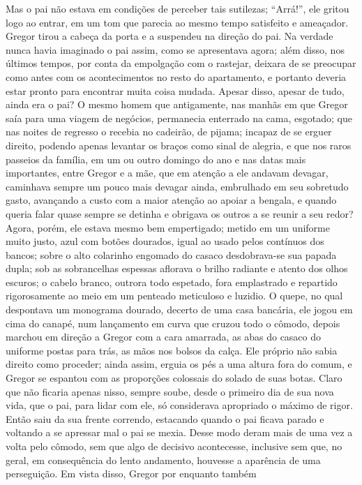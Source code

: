 Mas o pai não estava em condições de perceber tais sutilezas; “Arrá!”, ele
gritou logo ao entrar, em um tom que parecia ao mesmo tempo satisfeito e
ameaçador. Gregor tirou a cabeça da porta e a suspendeu na direção do pai.
Na verdade nunca havia imaginado o pai assim, como se apresentava agora;
além disso, nos últimos tempos, por conta da empolgação com o rastejar,
deixara de se preocupar como antes com os acontecimentos no resto do
apartamento, e portanto deveria estar pronto para encontrar muita coisa
mudada. Apesar disso, apesar de tudo, ainda era o pai? O mesmo homem que
antigamente, nas manhãs em que Gregor saía para uma viagem de negócios,
permanecia enterrado na cama, esgotado; que nas noites de regresso o
recebia no cadeirão, de pijama; incapaz de se erguer direito, podendo
apenas levantar os braços como sinal de alegria, e que nos raros passeios
da família, em um ou outro domingo do ano e nas datas mais importantes,
entre Gregor e a mãe, que em atenção a ele andavam devagar, caminhava
sempre um pouco mais devagar ainda, embrulhado em seu sobretudo gasto,
avançando a custo com a maior atenção ao apoiar a bengala, e quando queria
falar quase sempre se detinha e obrigava os outros a se reunir a seu
redor? Agora, porém, ele estava mesmo bem empertigado; metido em um
uniforme muito justo, azul com botões dourados, igual ao usado pelos
contínuos dos bancos; sobre o alto colarinho engomado do casaco
desdobrava-se sua papada dupla; sob as sobrancelhas espessas aflorava o
brilho radiante e atento dos olhos escuros; o cabelo branco, outrora todo
espetado, fora emplastrado e repartido rigorosamente ao meio em um
penteado meticuloso e luzidio. O quepe, no qual despontava um monograma
dourado, decerto de uma casa bancária, ele jogou em cima do canapé, num
lançamento em curva que cruzou todo o cômodo, depois marchou em direção a
Gregor com a cara amarrada, as abas do casaco do uniforme postas para
trás, as mãos nos bolsos da calça. Ele próprio não sabia direito como
proceder; ainda assim, erguia os pés a uma altura fora do comum, e Gregor
se espantou com as proporções colossais do solado de suas botas. Claro que
não ficaria apenas nisso, sempre soube, desde o primeiro dia de sua nova
vida, que o pai, para lidar com ele, só considerava apropriado o máximo de
rigor. Então saiu da sua frente correndo, estacando quando o pai ficava
parado e voltando a se apressar mal o pai se mexia. Desse modo deram mais
de uma vez a volta pelo cômodo, sem que algo de decisivo acontecesse,
inclusive sem que, no geral, em consequência do lento andamento, houvesse
a aparência de uma perseguição. Em vista disso, Gregor por enquanto também
